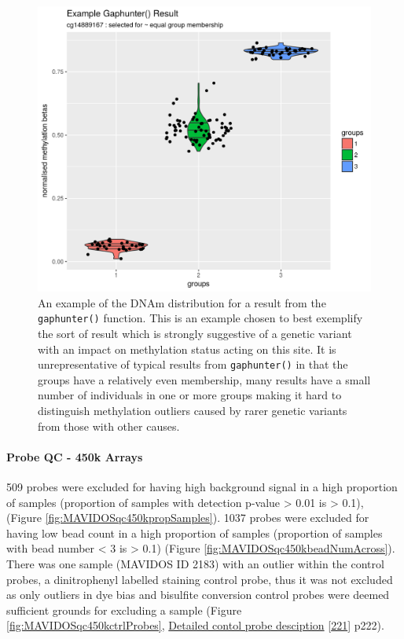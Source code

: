 \documentclass[
]{book}
\begin{document}
\begin{figure}

{\centering \includegraphics[width=0.8\linewidth]{figs/MAVIDOSgaphunterEgMonApr162018} 

}

\caption{An example of the DNAm distribution for a result from the \texttt{gaphunter()} function. This is an example chosen to best exemplify the sort of result which is strongly suggestive of a genetic variant with an impact on methylation status acting on this site. It is unrepresentative of typical results from \texttt{gaphunter()} in that the groups have a relatively even membership, many results have a small number of individuals in one or more groups making it hard to distinguish methylation outliers caused by rarer genetic variants from those with other causes.}\label{fig:MAVIDOSgaphunterEgMonApr162018}
\end{figure}



\hypertarget{probe-qc---450k-arrays}{%
\paragraph{Probe QC - 450k Arrays}\label{probe-qc---450k-arrays}}

509 probes were excluded for having high background signal in a high proportion of samples (proportion of samples with detection p-value \textgreater{} 0.01 is \textgreater{} 0.1), (Figure \ref{fig:MAVIDOSqc450kpropSamples}).
1037 probes were excluded for having low bead count in a high proportion of samples (proportion of samples with bead number \textless{} 3 is \textgreater{} 0.1) (Figure \ref{fig:MAVIDOSqc450kbeadNumAcross}).
There was one sample (MAVIDOS ID 2183) with an outlier within the control probes, a dinitrophenyl labelled staining control probe, thus it was not excluded as only outliers in dye bias and bisulfite conversion control probes were deemed sufficient grounds for excluding a sample (Figure \ref{fig:MAVIDOSqc450kctrlProbes}, \href{https://support.illumina.com/content/dam/illumina-support/documents/documentation/chemistry_documentation/infinium_assays/infinium_hd_methylation/infinium-hd-methylation-guide-15019519-01.pdf}{Detailed contol probe desciption} {[}\protect\hyperlink{ref-Illumina2015}{221}{]} p222).
\end{document}
